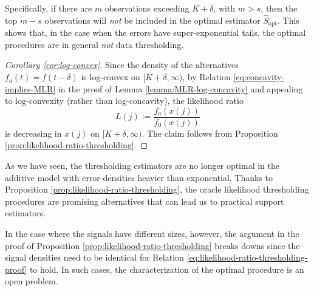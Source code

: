 Specifically, if there are $m$ observations exceeding $K+\delta$, with $m>s$, then the top $m-s$ observations will \emph{not} be included in the optimal estimator $\widehat{S}_{\text{opt}}$. This shows that, in the case when the 
errors have super-exponential tails, the optimal procedures are in general \emph{not} data thresholding.

\begin{proof}[Corollary \ref{cor:log-convex}]
Since the density of the alternatives $f_{a}(t) = {f(t-\delta)}$ is log-convex on $[K+\delta, \infty)$, by Relation \eqref{eq:concavity-implies-MLR} in the proof of Lemma \ref{lemma:MLR-log-concavity} and appealing to log-convexity (rather than log-concavity), the likelihood ratio
$$
L(j) := \frac{f_a(x(j))}{f_0(x(j))} %
$$
is decreasing in $x(j)$ on $[K+\delta, \infty)$.  The claim follows from Proposition \ref{prop:likelihood-ratio-thresholding}.
\end{proof}

\begin{remark} As we have seen, the thresholding estimators are no longer optimal 
in the additive model with error-densities heavier than exponential.   Thanks to Proposition 
\ref{prop:likelihood-ratio-thresholding}, the oracle likelihood thresholding procedures are promising alternatives
that can lead us to practical support estimators.  

In the case where the signals have different sizes, however, the argument in the proof of Proposition \ref{prop:likelihood-ratio-thresholding} breaks downs since the signal densities need to be identical for Relation \eqref{eq:likelihood-ratio-thresholding-proof} to hold.  In such cases, the characterization of the optimal procedure is an open problem.
\end{remark}








